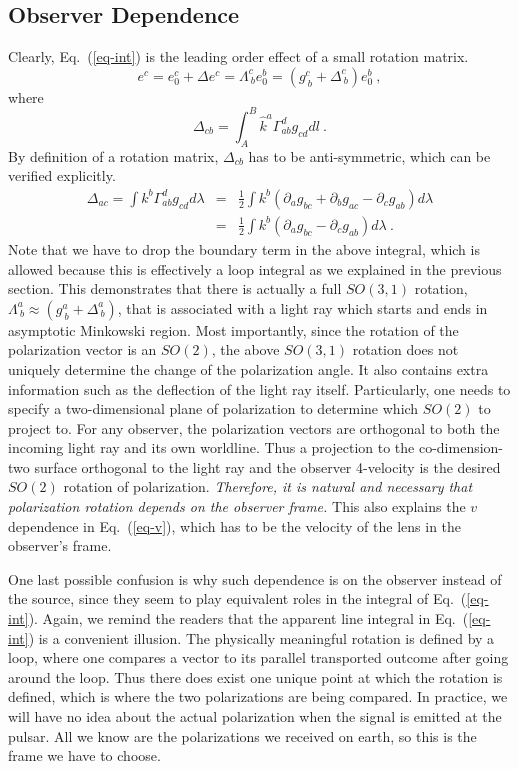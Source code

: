 \documentclass[aps,showpacs,twocolumn,floats,prd,superscriptaddress,nofootinbib]{revtex4-1}
\begin{document}
\subsection{Observer Dependence}

Clearly, Eq.~(\ref{eq-int}) is the leading order effect of a small rotation matrix.
\begin{equation}
e^c = e_0^c + \Delta e^c = \Lambda^c_{\ b} e_0^b = 
\left( g^c_{\ b} + \Delta^c_{\ b} \right) e_0^b~,
\end{equation}
where
\begin{equation}
\Delta_{cb} = \int_A^B \hat{k}^a \Gamma^d_{ab} g_{cd}dl~.
\end{equation}
By definition of a rotation matrix, $\Delta_{cb}$ has to be anti-symmetric, which can be verified explicitly.
\begin{eqnarray}
\Delta_{ac} = \int k^b\Gamma_{ab}^d g_{cd}d\lambda &=& 
\frac{1}{2} \int k^b \left(\partial_a g_{bc} + \partial_bg_{ac} - \partial_c g_{ab}\right)d\lambda
\label{eq-Delta} \nonumber \\
&=& \frac{1}{2} \int k^b \left(\partial_a g_{bc} - \partial_c g_{ab}\right)d\lambda~.
\end{eqnarray}
Note that we have to drop the boundary term in the above integral, which is allowed because this is effectively a loop integral as we explained in the previous section.
This demonstrates that there is actually a full $SO(3,1)$ rotation, $\Lambda^a_{\ b}\approx\left(g^a_{\ b} + \Delta^a_{\ b}\right)$, that is associated with a light ray which starts and ends in asymptotic Minkowski region. 
Most importantly, since the rotation of the polarization vector is an $SO(2)$, the above $SO(3,1)$ rotation does not uniquely determine the change of the polarization angle.
It also contains extra information such as the deflection of the light ray itself. 
Particularly, one needs to specify a two-dimensional plane of polarization to determine which $SO(2)$ to project to. 
For any observer, the polarization vectors are orthogonal to both the incoming light ray and its own worldline. 
Thus a projection to the co-dimension-two surface orthogonal to the light ray and the observer 4-velocity is the desired $SO(2)$ rotation of polarization. 
{\it Therefore, it is natural and necessary that polarization rotation depends on the observer frame.} This also explains the $v$ dependence in Eq.~(\ref{eq-v}), which has to be the velocity of the lens in the observer's frame.

One last possible confusion is why such dependence is on the observer instead of the source, since they seem to play equivalent roles in the integral of Eq.~(\ref{eq-int}). 
Again, we remind the readers that the apparent line integral in Eq.~(\ref{eq-int}) is a convenient illusion.
The physically meaningful rotation is defined by a loop, where one compares a vector to its parallel transported outcome after going around the loop.
Thus there does exist one unique point at which the rotation is defined, which is where the two polarizations are being compared. 
In practice, we will have no idea about the actual polarization when the signal is emitted at the pulsar. 
All we know are the polarizations we received on earth, so this is the frame we have to choose.
\end{document}
